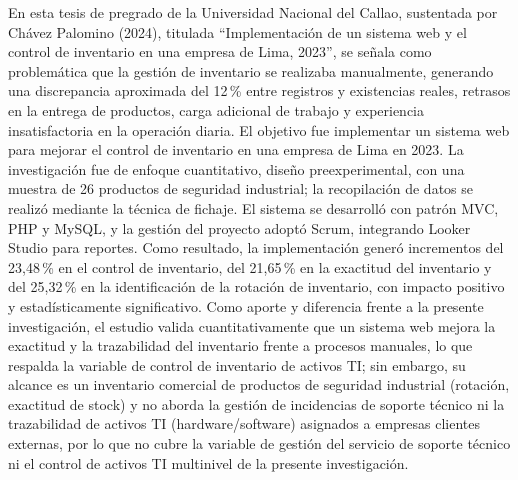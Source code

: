\vspace{0.8em}

En esta tesis de pregrado de la Universidad Nacional del Callao, sustentada por Chávez Palomino (2024), titulada ``Implementación de un sistema web y el control de inventario en una empresa de Lima, 2023'', se señala como problemática que la gestión de inventario se realizaba manualmente, generando una discrepancia aproximada del 12\,\% entre registros y existencias reales, retrasos en la entrega de productos, carga adicional de trabajo y experiencia insatisfactoria en la operación diaria. El objetivo fue implementar un sistema web para mejorar el control de inventario en una empresa de Lima en 2023. La investigación fue de enfoque cuantitativo, diseño preexperimental, con una muestra de 26 productos de seguridad industrial; la recopilación de datos se realizó mediante la técnica de fichaje. El sistema se desarrolló con patrón MVC, PHP y MySQL, y la gestión del proyecto adoptó Scrum, integrando Looker Studio para reportes. Como resultado, la implementación generó incrementos del 23,48\,\% en el control de inventario, del 21,65\,\% en la exactitud del inventario y del 25,32\,\% en la identificación de la rotación de inventario, con impacto positivo y estadísticamente significativo. Como aporte y diferencia frente a la presente investigación, el estudio valida cuantitativamente que un sistema web mejora la exactitud y la trazabilidad del inventario frente a procesos manuales, lo que respalda la variable de control de inventario de activos TI; sin embargo, su alcance es un inventario comercial de productos de seguridad industrial (rotación, exactitud de stock) y no aborda la gestión de incidencias de soporte técnico ni la trazabilidad de activos TI (hardware/software) asignados a empresas clientes externas, por lo que no cubre la variable de gestión del servicio de soporte técnico ni el control de activos TI multinivel de la presente investigación.

\vspace{0.8em}

